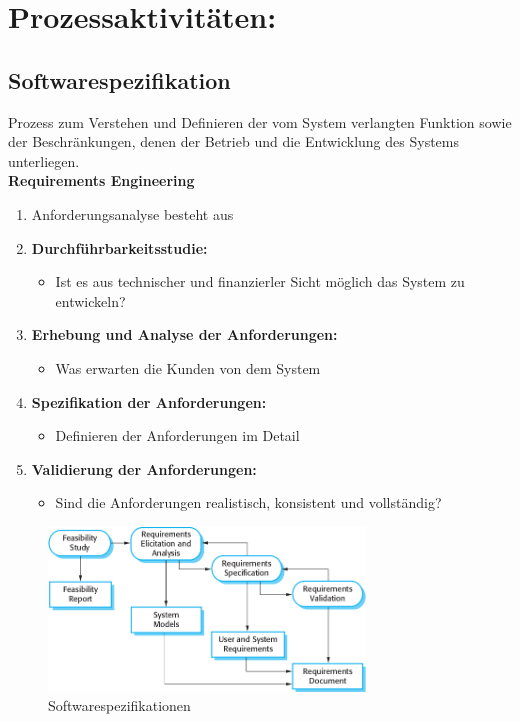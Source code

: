 \section{Prozessaktivitäten:}
\subsection{Softwarespezifikation}
Prozess zum Verstehen und Definieren der vom System verlangten Funktion sowie der Beschränkungen, denen der Betrieb und die Entwicklung des Systems unterliegen. 
\\
\textbf{Requirements Engineering}
\begin{enumerate}
    \item Anforderungsanalyse besteht aus 
    \item \textbf{Durchführbarkeitsstudie:}
    \begin{itemize}
        \item Ist es aus technischer und finanzierler Sicht möglich das System zu entwickeln?
    \end{itemize}
    \item \textbf{Erhebung und Analyse der Anforderungen:}
    \begin{itemize}
        \item Was erwarten die Kunden von dem System 
    \end{itemize}
    \item \textbf{Spezifikation der Anforderungen:}
    \begin{itemize}
        \item Definieren der Anforderungen im Detail
    \end{itemize}
    \item \textbf{Validierung der Anforderungen:}
    \begin{itemize}
        \item Sind die Anforderungen realistisch, konsistent und vollständig?
    \end{itemize}
\end{enumerate}
\begin{figure}[h] 
  \centering
     \includegraphics[width=0.75\textwidth]{mainmatter/pics/requ.png}
  \caption{Softwarespezifikationen}
\end{figure}

